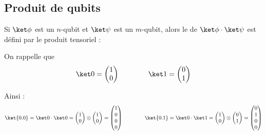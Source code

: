 \documentclass[11pt,class=report,crop=false]{standalone}
\begin{document}
\subsection{Produit de qubits}


Si $\ket\phi$ est un $n$-qubit et $\ket\psi$ est un $m$-qubit, alors
le  de $\ket\phi \cdot \ket\psi$ est défini par le produit tensoriel :
\mybox{$\ket\phi \cdot \ket\psi = \ket \phi \otimes \ket \psi$}

On rappelle que 
$$\ket0 = \begin{pmatrix}1\\0\end{pmatrix}
\qquad\qquad \ket1 = \begin{pmatrix}0\\1\end{pmatrix}$$

Ainsi :
$$\ket{0.0} = \ket0 \cdot \ket0 =   \begin{pmatrix}1\\0\end{pmatrix} \otimes \begin{pmatrix}1\\0\end{pmatrix} = \begin{pmatrix}1\\0\\0\\0\end{pmatrix}
\qquad\qquad
\ket{0.1} = \ket0 \cdot \ket1 =   \begin{pmatrix}1\\0\end{pmatrix} \otimes \begin{pmatrix}0\\1\end{pmatrix} = \begin{pmatrix}0\\1\\0\\0\end{pmatrix}$$
\end{document}
